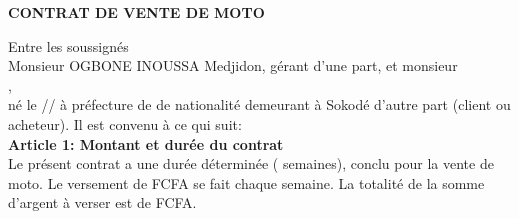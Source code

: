 \documentclass[12pt]{article}
\begin{document}
\begin{center}
\fontsize{12}{14}\selectfont
\textbf{\MakeUppercase{Contrat de Vente de Moto}}
\end{center}

\noindent Entre les soussignés \\
Monsieur OGBONE INOUSSA Medjidon, gérant d’une part, et monsieur \\
\underline{\hspace{10cm}},\\
né le \underline{\hspace{2cm}}/\underline{\hspace{2cm}}/\underline{\hspace{2cm}} à \underline{\hspace{5cm}} préfecture de \underline{\hspace{5cm}} de nationalité \underline{\hspace{5cm}} demeurant à Sokodé d’autre part (client ou acheteur). Il est convenu à ce qui suit:\\


\textbf{Article 1: Montant et durée du contrat} \\
Le présent contrat a une durée déterminée (\underline{\hspace{1cm}} semaines), conclu pour la vente de moto. Le versement de \underline{\hspace{5cm}} FCFA se fait chaque semaine. La totalité de la somme d'argent à verser est de \underline{\hspace{10cm}} FCFA.\\
\end{document}
